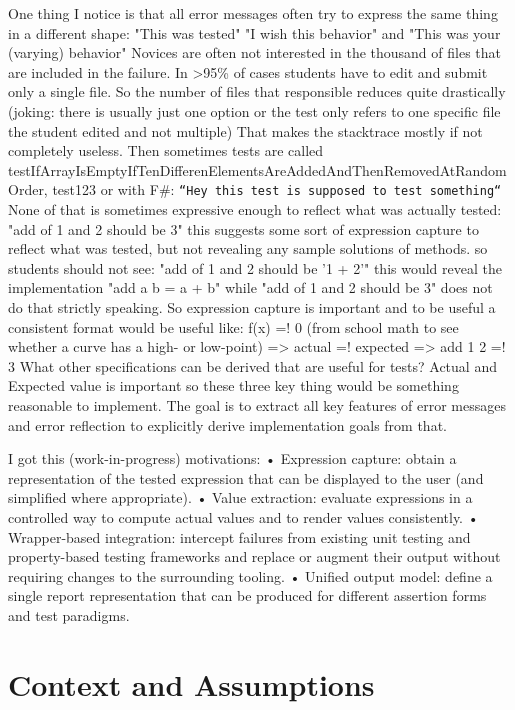 \documentclass[
	bibliography=totoc,
	listof=totoc,
]{scrbook}
\begin{document}
\begin{justify}
One thing I notice is that all error messages often try to express the same thing in a different shape:
"This was tested"
"I wish this behavior" and
"This was your (varying) behavior"
Novices are often not interested in the thousand of files that are included in the failure. In >95\% of cases students have to edit and submit only a single file.
So the number of files that responsible reduces quite drastically (joking: there is usually just one option or the test only refers to one specific file the student edited and not multiple)
That makes the stacktrace mostly if not completely useless.
Then sometimes tests are called testIfArrayIsEmptyIfTenDifferenElementsAreAddedAndThenRemovedAtRandomOrder, test123 or with F\#:
\texttt{``Hey this test is supposed to test something``}
None of that is sometimes expressive enough to reflect what was actually tested: "add of 1 and 2 should be 3"
this suggests some sort of expression capture to reflect what was tested, but not revealing any sample solutions of methods.
so students should not see: "add of 1 and 2 should be '1 + 2'"
this would reveal the implementation "add a b = a + b" while "add of 1 and 2 should be 3" does not do that strictly speaking.
So expression capture is important and to be useful a consistent format would be useful like: f(x) =! 0 (from school math to see whether a curve has a high- or low-point)
=> actual =! expected
=> add 1 2 =! 3
What other specifications can be derived that are useful for tests?
Actual and Expected value is important so these three key thing would be something reasonable to implement.
The goal is to extract all key features of error messages and error reflection to explicitly derive implementation goals from that.

I got this (work-in-progress) motivations:
• Expression capture: obtain a representation of the tested expression that
can be displayed to the user (and simplified where appropriate).
• Value extraction: evaluate expressions in a controlled way to compute
actual values and to render values consistently.
• Wrapper-based integration: intercept failures from existing unit testing
and property-based testing frameworks and replace or augment their output
without requiring changes to the surrounding tooling.
• Unified output model: define a single report representation that can be
produced for different assertion forms and test paradigms.
\end{justify}


\section{Context and Assumptions} %
\end{document}
